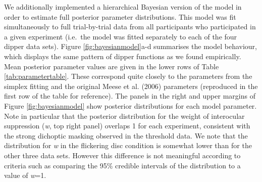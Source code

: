 \documentclass[
]{article}
\begin{document}
We additionally implemented a hierarchical Bayesian version of the model in order to estimate full posterior parameter distributions. This model was fit simultaneously to full trial-by-trial data from all participants who participated in a given experiment (i.e.~the model was fitted separately to each of the four dipper data sets). Figure \ref{fig:bayesianmodel}a-d summarises the model behaviour, which displays the same pattern of dipper functions as we found empirically. Mean posterior parameter values are given in the lower rows of Table \ref{tab:parametertable}. These correspond quite closely to the parameters from the simplex fitting and the original Meese et al. (2006) parameters (reproduced in the first row of the table for reference). The panels in the right and upper margins of Figure \ref{fig:bayesianmodel} show posterior distributions for each model parameter. Note in particular that the posterior distribution for the weight of interocular suppression (\emph{w}, top right panel) overlaps 1 for each experiment, consistent with the strong dichoptic masking observed in the threshold data. We note that the distribution for \emph{w} in the flickering disc condition is somewhat lower than for the other three data sets. However this difference is not meaningful according to criteria such as comparing the 95\% credible intervals of the distribution to a value of \emph{w}=1.
\end{document}
